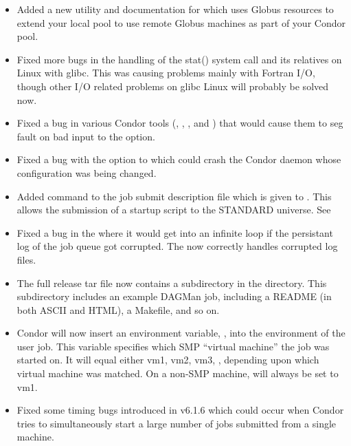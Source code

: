 \begin{itemize}
\item Added a new utility and documentation for  which uses 
Globus resources to extend your local pool to use remote Globus machines as 
part of your Condor pool.

\item Fixed more bugs in the handling of the stat() system call
and its relatives on Linux with glibc.
This was causing problems mainly with Fortran I/O, though other I/O
related problems on glibc Linux will probably be solved now.

\item Fixed a bug in various Condor tools (,
, , and ) that
would cause them to seg fault on bad input to the  option. 

\item Fixed a bug with the  option to  which
could crash the Condor daemon whose configuration was being changed.

\item Added  command to the job submit
description file which is given to .  This allows the
submission of a startup script to the STANDARD universe.  See 

\item Fixed a bug in the  where it would get into an
infinite loop if the persistant log of the job queue got corrupted.  
The  now correctly handles corrupted log files.

\item The full release tar file now contains a 
subdirectory in the  directory.
This subdirectory includes an example DAGMan job, including a README
(in both ASCII and HTML), a Makefile, and so on.

\item Condor will now insert an environment variable, , into
the environment of the user job.  
This variable specifies which SMP ``virtual machine'' the job was started on.
It will equal either vm1, vm2, vm3, \Dots , depending upon which virtual
machine was matched.
On a non-SMP machine,  will always be set to vm1.

\item Fixed some timing bugs introduced in v6.1.6 which could occur when
Condor tries to simultaneously start a large number of jobs submitted from a
single machine.


\end{itemize}
